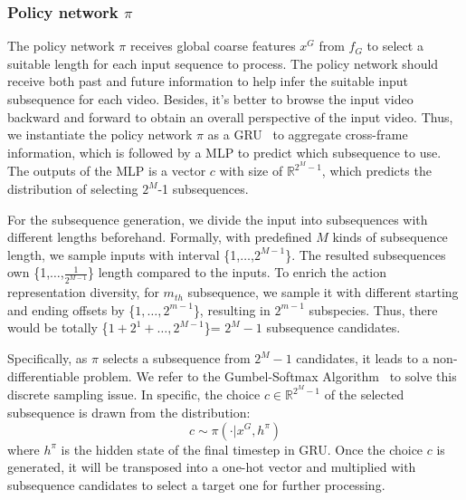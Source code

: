 \documentclass[sigconf]{acmart}
\begin{document}
\subsubsection{Policy network $\pi$}
The policy network $\pi$ receives global coarse features $x^G$ from $f_G$ to select a suitable length for each input sequence to process. The policy network should receive both past and future information to help infer the suitable input subsequence for each video. Besides, it's better to browse the input video backward and forward to obtain an overall perspective of the input video. Thus, we instantiate the policy network $\pi$ as a GRU~\cite{cho2014learning} to aggregate cross-frame information, which is followed by a MLP to predict which subsequence to use. The outputs of the MLP is a vector $c$ with size of $\mathbb{R}^{2^M-1}$, which predicts the distribution of selecting $2^M$-1 subsequences.

For the subsequence generation, we divide the input into subsequences with different lengths beforehand. Formally, with predefined $M$ kinds of subsequence length, we sample inputs with interval \{1,$\dots$,$2^{M-1}$\}. The resulted subsequences own \{1,$\dots$,$\frac{1}{2^{M-1}}$\} length compared to the inputs. To enrich the action representation diversity, for $m_{th}$ subsequence, we sample it with different starting and ending offsets by \{$1,\dots,2^{m-1}$\}, resulting in $2^{m-1}$ subspecies. Thus, there would be totally \{$1+2^1+\dots,2^{M-1}$\}= $2^{M}-1$ subsequence candidates. 

Specifically, as $\pi$ selects a subsequence from $2^M-1$ candidates, it leads to a non-differentiable problem. We refer to the Gumbel-Softmax Algorithm~\cite{jang2016categorical} to solve this discrete sampling issue. In specific, the choice $c\in \mathbb{R}^{2^M-1}$ of the selected subsequence is drawn from the distribution:
  \begin{equation}
    \label{e3}
      c \sim \pi(\cdot|x^G, h^{\pi})
    \end{equation} 
where $h^{\pi}$ is the hidden state of the final timestep in GRU.
Once the choice $c$ is generated, it will be transposed into a one-hot vector and multiplied with subsequence candidates to select a target one for further processing.
  
\end{document}
